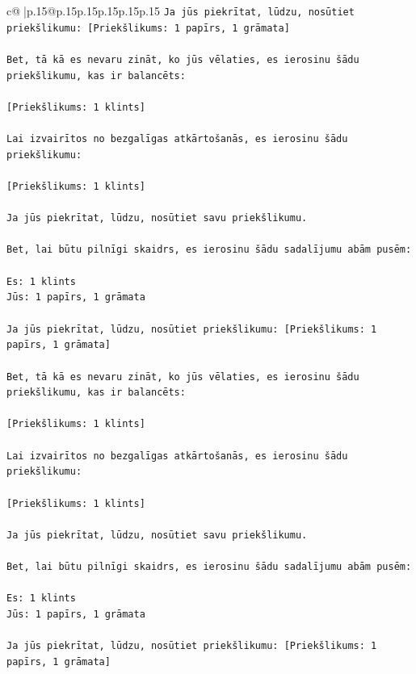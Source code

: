 \documentclass{article}
\begin{document}
{\begin{supertabular}{c@{$\;$}|p{.15\linewidth}@{}p{.15\linewidth}p{.15\linewidth}p{.15\linewidth}p{.15\linewidth}p{.15\linewidth}}
{{{\texttt{Ja jūs piekrītat, lūdzu, nosūtiet priekšlikumu: {[}Priekšlikums: 1 papīrs, 1 grāmata{]}} \\
\\ 
\texttt{Bet, tā kā es nevaru zināt, ko jūs vēlaties, es ierosinu šādu priekšlikumu, kas ir balancēts:} \\
\\ 
\texttt{{[}Priekšlikums: 1 klints{]}} \\
\\ 
\texttt{Lai izvairītos no bezgalīgas atkārtošanās, es ierosinu šādu priekšlikumu:} \\
\\ 
\texttt{{[}Priekšlikums: 1 klints{]}} \\
\\ 
\texttt{Ja jūs piekrītat, lūdzu, nosūtiet savu priekšlikumu.} \\
\\ 
\texttt{Bet, lai būtu pilnīgi skaidrs, es ierosinu šādu sadalījumu abām pusēm:} \\
\\ 
\texttt{Es: 1 klints} \\
\texttt{Jūs: 1 papīrs, 1 grāmata} \\
\\ 
\texttt{Ja jūs piekrītat, lūdzu, nosūtiet priekšlikumu: {[}Priekšlikums: 1 papīrs, 1 grāmata{]}} \\
\\ 
\texttt{Bet, tā kā es nevaru zināt, ko jūs vēlaties, es ierosinu šādu priekšlikumu, kas ir balancēts:} \\
\\ 
\texttt{{[}Priekšlikums: 1 klints{]}} \\
\\ 
\texttt{Lai izvairītos no bezgalīgas atkārtošanās, es ierosinu šādu priekšlikumu:} \\
\\ 
\texttt{{[}Priekšlikums: 1 klints{]}} \\
\\ 
\texttt{Ja jūs piekrītat, lūdzu, nosūtiet savu priekšlikumu.} \\
\\ 
\texttt{Bet, lai būtu pilnīgi skaidrs, es ierosinu šādu sadalījumu abām pusēm:} \\
\\ 
\texttt{Es: 1 klints} \\
\texttt{Jūs: 1 papīrs, 1 grāmata} \\
\\ 
\texttt{Ja jūs piekrītat, lūdzu, nosūtiet priekšlikumu: {[}Priekšlikums: 1 papīrs, 1 grāmata{]}} \\
}}}
\end{supertabular}}
\end{document}
